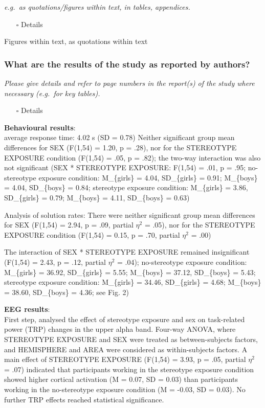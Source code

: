 \documentclass[
  doc, a4paper]{apa7}
\providecommand{\tightlist}{%
  \setlength{\itemsep}{0pt}\setlength{\parskip}{0pt}}
\begin{document}
\emph{e.g.~as quotations/figures within text, in tables, appendices.}

\begin{itemize}
\tightlist
\item[$\square$]
  Details
\end{itemize}

Figures within text, as quotations within text

\subsubsection{What are the results of the study as reported by authors?}\label{what-are-the-results-of-the-study-as-reported-by-authors}

\emph{Please give details and refer to page numbers in the report(s) of the study where necessary (e.g.~for key tables).}

\begin{itemize}
\tightlist
\item[$\square$]
  Details
\end{itemize}

\textbf{Behavioural results}:\\
average response time: 4.02 s (SD = 0.78)
Neither significant group mean differences for SEX (F(1,54) = 1.20, p = .28), nor for the STEREOTYPE EXPOSURE condition (F(1,54) = .05, p = .82); the two-way interaction was also not significant (SEX * STEREOTYPE EXPOSURE: F(1,54) = .01, p = .95; no-stereotype exposure condition: M\_\{girls\} = 4.04, SD\_\{girls\} = 0.91; M\_\{boys\} = 4.04, SD\_\{boys\} = 0.84; stereotype exposure condition: M\_\{girls\} = 3.86, SD\_\{girls\} = 0.79; M\_\{boys\} = 4.11, SD\_\{boys\} = 0.63)

Analysis of solution rates: There were neither significant group mean differences for SEX (F(1,54) = 2.94, p = .09, partial \(\eta^2\) = .05), nor for the STEREOTYPE EXPOSURE condition (F(1,54) = 0.15, p = .70, partial \(\eta^2\) = .00)

The interaction of SEX * STEREOTYPE EXPOSURE remained insignificant (F(1,54) = 2.43, p = .12, partial \(\eta^2\) = .04); no-stereotype exposure condition: M\_\{girls\} = 36.92, SD\_\{girls\} = 5.55; M\_\{boys\} = 37.12, SD\_\{boys\} = 5.43; stereotype exposure condition: M\_\{girls\} = 34.46, SD\_\{girls\} = 4.68; M\_\{boys\} = 38.60, SD\_\{boys\} = 4.36; see Fig. 2)

\textbf{EEG results}:\\
First step, analysed the effect of stereotype exposure and sex on task-related power (TRP) changes in the upper alpha band. Four-way ANOVA, where STEREOTYPE EXPOSURE and SEX were treated as between-subjects factors, and HEMISPHERE and AREA were considered as within-subjects factors. A main effect of STEREOTYPE EXPOSURE (F(1,54) = 3.93, p = .05, partial \(\eta^2\) = .07) indicated that participants working in the stereotype exposure condition showed higher cortical activation (M = 0.07, SD = 0.03) than participants working in the no-stereotype exposure condition (M = -0.03, SD = 0.03). No further TRP effects reached statistical significance.
\end{document}
